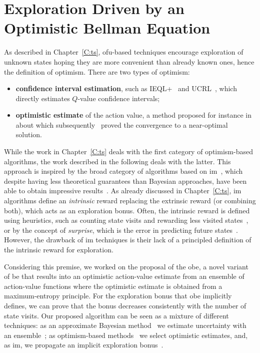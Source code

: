 \chapter{Exploration Driven by an Optimistic Bellman Equation}\label{C:opt}
As described in Chapter~\ref{C:ts}, \gls{ofu}-based techniques encourage exploration of unknown states hoping they are more convenient than already known ones, hence the definition of optimism. There are two types of optimism:
\begin{itemize}
\item \textbf{confidence interval estimation}, such as IEQL+~\cite{meuleau1999exploration} and UCRL~\cite{auer2007logarithmic}, which directly estimates $Q$-value confidence intervals;
 \item \textbf{optimistic estimate} of the action value, a method proposed for instance in~\cite{sutton1998reinforcement} about which subsequently~\cite{even2002convergence} proved the convergence to a near-optimal solution.
\end{itemize}
While the work in Chapter~\ref{C:ts} deals with the first category of optimism-based algorithms, the work described in the following deals with the latter. This approach is inspired by the broad category of algorithms based on \gls{im}~\cite{singh2004intrinsically}, which despite having less theoretical guarantees
than Bayesian approaches, have been able to obtain impressive results~\cite{bellemare2016unifying}. As already discussed in Chapter~\ref{C:ts}, \gls{im}
algorithms define an \textit{intrinsic} reward replacing the extrinsic reward (or combining both), which acts as an exploration bonus. Often, the intrinsic reward is defined using heuristics, such as counting state visits and rewarding less visited states~\cite{ostrovski2017count}, or by the concept of \textit{surprise}, which is the error in predicting future states~\cite{pathak2017curiosity}. However, the drawback of \gls{im} techniques is their lack of a principled definition of the intrinsic reward for exploration.

Considering this premise, we worked on the proposal of the \gls{obe}, a novel variant of \gls{be} that results into an optimistic action-value estimate
from an ensemble of action-value functions where the optimistic estimate is obtained from a maximum-entropy principle. For the exploration bonus that \gls{obe} implicitly defines, we can prove that the bonus decreases consistently with the number of
state visits. Our proposed algorithm can be seen as a mixture of
different techniques: as an approximate Bayesian method~\cite{engel2005reinforcement,vlassis2012bayesian} we estimate uncertainty with an ensemble~\cite{osband2017deep}; as optimism-based methods~\cite{lai1985asymptotically,kearns2002near,brafman2002r,azizzadenesheli2517efficient} we select
optimistic estimates, and, as \gls{im}, we propagate an implicit
exploration bonus~\cite{singh2004intrinsically,schmidhuber2008driven,white2010interval}.

